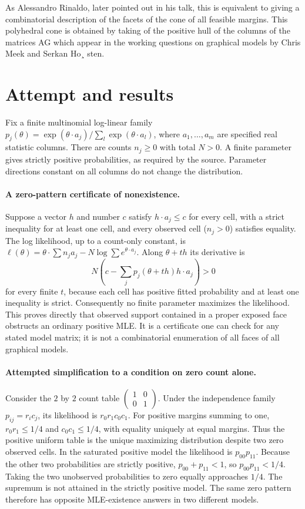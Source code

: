 \documentclass[11pt]{article}
\begin{document}
As Alessandro Rinaldo, later pointed out in his talk, this is equivalent to giving a combinatorial description of the facets of the cone of all feasible margins. This polyhedral cone is obtained by taking of the positive hull of the columns of the matrices AG which appear in the working questions on graphical models by Chris Meek and Serkan Ho¸ sten.

\section{Attempt and results}
Fix a finite multinomial log-linear family
$p_j(\theta)=\exp(\theta\cdot a_j)/\sum_l\exp(\theta\cdot a_l)$,
where $a_1,\ldots,a_m$ are specified real statistic columns. There are
counts $n_j\ge0$ with total $N>0$. A finite parameter gives strictly
positive probabilities, as required by the source. Parameter directions
constant on all columns do not change the distribution.

\paragraph{A zero-pattern certificate of nonexistence.}
Suppose a vector $h$ and number $c$ satisfy $h\cdot a_j\le c$ for every
cell, with a strict inequality for at least one cell, and every observed
cell ($n_j>0$) satisfies equality. The log likelihood, up to a count-only
constant, is
$\ell(\theta)=\theta\cdot\sum n_ja_j-N\log\sum e^{\theta\cdot a_j}$.
Along $\theta+th$ its derivative is
\[
N\left(c-\sum_jp_j(\theta+th)h\cdot a_j\right)>0
\]
for every finite $t$, because each cell has positive fitted probability
and at least one inequality is strict. Consequently no finite parameter
maximizes the likelihood. This proves directly that observed support
contained in a proper exposed face obstructs an ordinary positive MLE.
It is a certificate one can check for any stated model matrix; it is not
a combinatorial enumeration of all faces of all graphical models.

\paragraph{Attempted simplification to a condition on zero count alone.}
Consider the $2$ by $2$ count table
$\left(\begin{smallmatrix}1&0\\0&1\end{smallmatrix}\right)$.
Under the independence family $p_{ij}=r_i c_j$, its likelihood is
$r_0r_1c_0c_1$. For positive margins summing to one,
$r_0r_1\le1/4$ and $c_0c_1\le1/4$, with equality uniquely at equal
margins. Thus the positive uniform table is the unique maximizing
distribution despite two zero observed cells.
In the saturated positive model the likelihood is $p_{00}p_{11}$.
Because the other two probabilities are strictly positive,
$p_{00}+p_{11}<1$, so $p_{00}p_{11}<1/4$. Taking the two unobserved
probabilities to zero equally approaches $1/4$. The supremum is not
attained in the strictly positive model. The same zero pattern therefore
has opposite MLE-existence answers in two different models.
\end{document}
